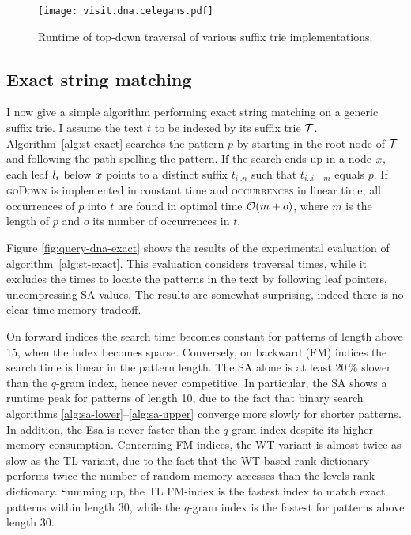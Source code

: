 \begin{figure}[h!]
\begin{center}
\caption[Top-down traversal runtime]{Runtime of top-down traversal of various suffix trie implementations.}
\label{fig:visit-dna}
\texttt{[image: visit.dna.celegans.pdf]}
\end{center}
\end{figure}

\subsection{Exact string matching}
\label{sec:index:algo:exact}

I now give a simple algorithm performing exact string matching on a generic suffix trie.
I assume the text $t$ to be indexed by its suffix trie $\mathcal {T}$.
Algorithm~\ref{alg:st-exact} searches the pattern $p$ by starting in the root node of $\mathcal {T}$ and following the path spelling the pattern.
If the search ends up in a node $x$, each leaf $l_i$ below $x$ points to a distinct suffix $t_{i..n}$ such that $t_{i..i+m}$ equals $p$.
If \textsc{goDown} is implemented in constant time and \textsc{occurrences} in linear time, all occurrences of $p$ into $t$ are found in optimal time $\mathcal{O}(m+o)$, where $m$ is the length of $p$ and $o$ its number of occurrences in $t$.

Figure \ref{fig:query-dna-exact} shows the results of the experimental evaluation of algorithm~\ref{alg:st-exact}.
This evaluation considers traversal times, while it excludes the times to locate the patterns in the text by following leaf pointers, \eg uncompressing SA values.
The results are somewhat surprising, indeed there is no clear time-memory tradeoff.

On forward indices the search time becomes constant for patterns of length above 15, \ie when the index becomes sparse.
Conversely, on backward (FM) indices the search time is linear in the pattern length. 
The SA alone is at least 20\,\% slower than the $q$-gram index, hence never competitive.
In particular, the SA shows a runtime peak for patterns of length 10, due to the fact that binary search algorithms \ref{alg:sa-lower}--\ref{alg:sa-upper} converge more slowly for shorter patterns.
In addition, the Esa is never faster than the $q$-gram index despite its higher memory consumption.
Concerning FM-indices, the WT variant is almost twice as slow as the TL variant, due to the fact that the WT-based rank dictionary performs twice the number of random memory accesses than the levels rank dictionary.
Summing up, the TL FM-index is the fastest index to match exact patterns within length 30, while the $q$-gram index is the fastest for patterns above length 30.

